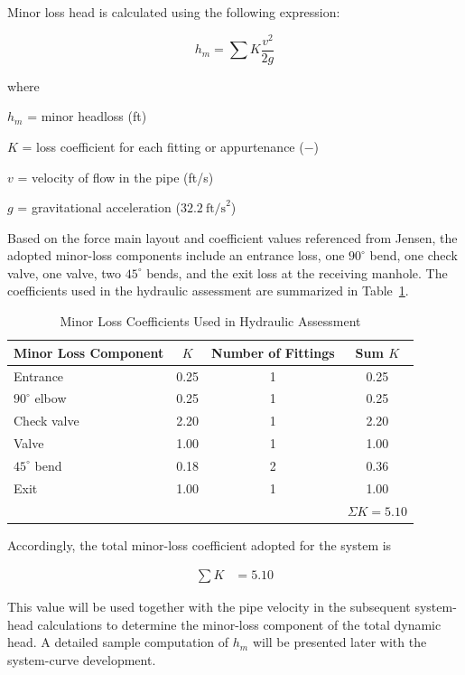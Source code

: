 Minor loss head is calculated using the following expression:

\begin{equation}
h_m = \sum K \frac{v^2}{2g}
\end{equation}



where

$h_m$ = minor headloss (ft)

$K$ = loss coefficient for each fitting or appurtenance ($-$)

$v$ = velocity of flow in the pipe (ft/s)

$g$ = gravitational acceleration ($32.2~\text{ft/s}^2$)

Based on the force main layout and coefficient values referenced from Jensen, the adopted minor-loss components include an entrance loss, one $90^\circ$ bend, one check valve, one valve, two $45^\circ$ bends, and the exit loss at the receiving manhole. The coefficients used in the hydraulic assessment are summarized in Table~\ref{tab:minor_losses}.

\begin{table}[H]
\centering
\caption{Minor Loss Coefficients Used in Hydraulic Assessment}
\label{tab:minor_losses}
\begin{tabular}{lccc}
\toprule
\textbf{Minor Loss Component} & \textbf{$K$} & \textbf{Number of Fittings} & \textbf{Sum $K$} \\
\midrule
Entrance & 0.25 & 1 & 0.25 \\
$90^\circ$ elbow & 0.25 & 1 & 0.25 \\
Check valve & 2.20 & 1 & 2.20 \\
Valve & 1.00 & 1 & 1.00 \\
$45^\circ$ bend & 0.18 & 2 & 0.36 \\
Exit & 1.00 & 1 & 1.00 \\
\midrule
 &  &  & $\Sigma K = 5.10$ \\
\bottomrule
\end{tabular}
\end{table}

Accordingly, the total minor-loss coefficient adopted for the system is

\[
\begin{aligned}
\sum K &= 5.10
\end{aligned}
\]

This value will be used together with the pipe velocity in the subsequent system-head calculations to determine the minor-loss component of the total dynamic head. A detailed sample computation of $h_m$ will be presented later with the system-curve development.


